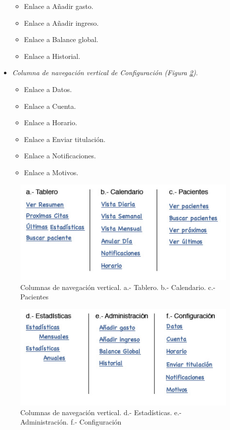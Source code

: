 \documentclass[a4paper,oneside,11pt]{book}
\begin{document}
\begin{itemize}
					\begin{itemize}
						\item Enlace a Añadir gasto.
						\item Enlace a Añadir ingreso.
						\item Enlace a Balance global.
						\item Enlace a Historial.
					\end{itemize}
				\item \textit{Columna de navegación vertical de Configuración (Figura \ref{fig:nav_medico_lat2})}.
					\begin{itemize}
						\item Enlace a Datos.
						\item Enlace a Cuenta.
						\item Enlace a Horario.
						\item Enlace a Enviar titulación.
						\item Enlace a Notificaciones.
						\item Enlace a Motivos.
					\end{itemize}
			\end{itemize}
			
			\begin{figure}[H]
			  \centering
			    \includegraphics[width=11cm]{img/jpg/nav/medico_lat1.jpg}
			  \caption{Columnas de navegación vertical. a.- Tablero. b.- Calendario. c.- Pacientes}
			  \label{fig:nav_medico_lat1}
			\end{figure}
			
			\begin{figure}[H]
			  \centering
			    \includegraphics[width=11cm]{img/jpg/nav/medico_lat2.jpg}
			  \caption{Columnas de navegación vertical. d.- Estadísticas. e.- Administración. f.- Configuración}
			  \label{fig:nav_medico_lat2}
			\end{figure}
			
\end{document}

